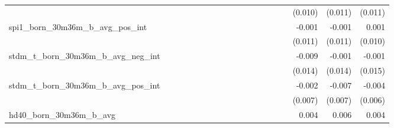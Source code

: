 \begin{tabular}{lrrrrrrrrrrrrrrrrrr}
                                            &              &              &              &              &              &              &              &              &               &              &              &               &              &              &               &      (0.010) &      (0.011) &       (0.011) \\ 
spi1\_born\_30m36m\_b\_avg\_pos\_int        &              &              &              &              &              &              &              &              &               &              &              &               &              &              &               &       -0.001 &       -0.001 &         0.001 \\ 
                                            &              &              &              &              &              &              &              &              &               &              &              &               &              &              &               &      (0.011) &      (0.011) &       (0.010) \\ 
stdm\_t\_born\_30m36m\_b\_avg\_neg\_int     &              &              &              &              &              &              &              &              &               &              &              &               &              &              &               &       -0.009 &       -0.001 &        -0.001 \\ 
                                            &              &              &              &              &              &              &              &              &               &              &              &               &              &              &               &      (0.014) &      (0.014) &       (0.015) \\ 
stdm\_t\_born\_30m36m\_b\_avg\_pos\_int     &              &              &              &              &              &              &              &              &               &              &              &               &              &              &               &       -0.002 &       -0.007 &        -0.004 \\ 
                                            &              &              &              &              &              &              &              &              &               &              &              &               &              &              &               &      (0.007) &      (0.007) &       (0.006) \\ 
hd40\_born\_30m36m\_b\_avg                  &              &              &              &              &              &              &              &              &               &              &              &               &              &              &               &        0.004 &        0.006 &         0.004 \\ 

\end{tabular}
